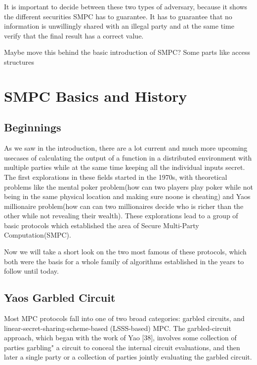 \documentclass[english,runningheads,a4paper]{llncs}[2018/03/10]
\begin{document}
It is important to decide between these two types of adversary, because it shows the different securities SMPC has to guarantee. It has to guarantee that no information is unwillingly shared with an illegal party and at the same time verify that the final result has a correct value.


Maybe move this behind the basic introduction of SMPC? Some parts like access structures 



\section{SMPC Basics and History}\label{sec:smpc}
\subsection{Beginnings}
As we saw in the introduction, there are a lot current and much more upcoming usecases of calculating the output of a function in a distributed environment with multiple parties while at the same time keeping all the individual inputs secret. The first explorations in these fields started in the 1970s, with theoretical problems like the mental poker problem(how can two players play poker while not being in the same physical location and making sure noone is cheating) and Yaos millionaire problem(how can can two millionaires decide who is richer than the other while not revealing their wealth). \newline
These explorations lead to a group of basic protocols which established the area of Secure Multi-Party Computation(SMPC).

 Now we will take a short look on the two most famous of these protocols, which both were the basis for a whole family of algorithms established in the years to follow until today.

\subsection{Yaos Garbled Circuit}

Most MPC protocols fall into one of two broad categories: garbled circuits,
and linear-secret-sharing-scheme-based (LSSS-based) MPC. The garbled-circuit
approach, which began with the work of Yao [38], involves some collection of
parties garbling" a circuit to conceal the internal circuit evaluations, and then
later a single party or a collection of parties jointly evaluating the garbled circuit.
\end{document}

